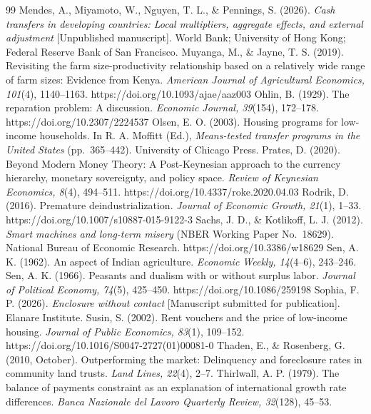 \documentclass[preprint,review,12pt]{elsarticle}
\begin{document}
\begin{thebibliography}{99}
 Mendes, A., Miyamoto, W., Nguyen, T. L., \& Pennings, S. (2026). \emph{Cash transfers in developing countries: Local multipliers, aggregate effects, and external adjustment} {[}Unpublished manuscript{]}. World Bank; University of Hong Kong; Federal Reserve Bank of San Francisco. 
 Muyanga, M., \& Jayne, T. S. (2019). Revisiting the farm size-productivity relationship based on a relatively wide range of farm sizes: Evidence from Kenya. \emph{American Journal of Agricultural Economics, 101}(4), 1140--1163. https://doi.org/10.1093/ajae/aaz003 
 Ohlin, B. (1929). The reparation problem: A discussion. \emph{Economic Journal, 39}(154), 172--178. https://doi.org/10.2307/2224537 
 Olsen, E. O. (2003). Housing programs for low-income households. In R. A. Moffitt (Ed.), \emph{Means-tested transfer programs in the United States} (pp.~365--442). University of Chicago Press. 
 Prates, D. (2020). Beyond Modern Money Theory: A Post-Keynesian approach to the currency hierarchy, monetary sovereignty, and policy space. \emph{Review of Keynesian Economics, 8}(4), 494--511. https://doi.org/10.4337/roke.2020.04.03 
 Rodrik, D. (2016). Premature deindustrialization. \emph{Journal of Economic Growth, 21}(1), 1--33. https://doi.org/10.1007/s10887-015-9122-3 
 Sachs, J. D., \& Kotlikoff, L. J. (2012). \emph{Smart machines and long-term misery} (NBER Working Paper No.~18629). National Bureau of Economic Research. https://doi.org/10.3386/w18629 
 Sen, A. K. (1962). An aspect of Indian agriculture. \emph{Economic Weekly, 14}(4--6), 243--246. 
 Sen, A. K. (1966). Peasants and dualism with or without surplus labor. \emph{Journal of Political Economy, 74}(5), 425--450. https://doi.org/10.1086/259198 
 Sophia, F. P. (2026). \emph{Enclosure without contact} {[}Manuscript submitted for publication{]}. Elanare Institute. 
 Susin, S. (2002). Rent vouchers and the price of low-income housing. \emph{Journal of Public Economics, 83}(1), 109--152. https://doi.org/10.1016/S0047-2727(01)00081-0 
 Thaden, E., \& Rosenberg, G. (2010, October). Outperforming the market: Delinquency and foreclosure rates in community land trusts. \emph{Land Lines, 22}(4), 2--7. 
 Thirlwall, A. P. (1979). The balance of payments constraint as an explanation of international growth rate differences. \emph{Banca Nazionale del Lavoro Quarterly Review, 32}(128), 45--53. 

\end{thebibliography}
\end{document}
